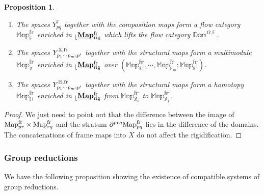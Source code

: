 \documentclass[reqno, 10pt]{amsart}
\numberwithin{equation}{section}
\numberwithin{equation}{section}
\newtheorem{prop}[thm]{Proposition}
\theoremstyle{definition}
\theoremstyle{remark}
\newcommand{\mb}{\mathbb}
\renewcommand{\outer}{{}_{\lfloor}}
\newcommand{\uds}[1]{\underline{\smash{#1}}}
\begin{document}
\begin{prop}\label{prop:reference-diagram}
\begin{enumerate}

\item The spaces $Y_{pq}^{\mb F}$ together with the composition maps form a flow category $\mb{Map}_{\mb F}^{\mb{fr}}$ enriched in $\outer \uds{\bf Map}^{\rm fr}_{\rm rig}$ which lifts the flow category $\mb{Dom}^{\Omega, {\mb F}}$. 

\item The spaces $Y_{p_1\cdots p_m; p'}^{{\mb X}, {\rm fr}}$ together with the structural maps form a multimodule $\mb{Map}_{\mb X}^{\mb{fr}}$ enriched in $\outer \uds{\bf Map}^{\rm fr}_{\rm rig}$ over $(\mb{Map}_{{\mb F}_1}^{\mb{fr}}, \cdots, \mb{Map}_{{\mb F}_m}^{\mb{fr}}; \mb{Map}_{{\mb F}'}^{\mb{fr}})$.

\item The spaces $Y_{p_1 \cdots p_m; p'}^{{\mb H}, {\rm fr}}$ together with the structural maps form a homotopy $\mb{Map}_{\mb H}^{\mb{fr}}$ enriched in $\outer \uds{\bf Map}^{\rm fr}_{\rm rig}$ from $\mb{Map}_{{\mb X}_0}^{\mb{fr}}$ to $\mb{Map}_{\mb{X}_1}^{\mb{fr}}$.
\end{enumerate}
\end{prop}

\begin{proof}
We just need to point out that the difference between the image of ${\rm Map}_{pr}^{\rm fr}\times {\rm Map}_{rq}^{\rm fr}$ and the stratum $\partial^{prq} {\rm Map}_{pq}^{\rm fr}$ lies in the difference of the domains. The concatenations of frame maps into $X$ do not affect the rigidification.
\end{proof}

\subsubsection{Group reductions}











We have the following proposition showing the existence of compatible systems of group reductions.
\end{document}
